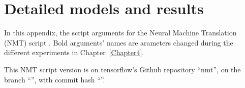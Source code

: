 
\chapter{Detailed models and results} %

\label{AppendixB} %

In this appendix, the script arguments for the Neural Machine Translation (NMT) script \citep{tensorflow.nmt}. Bold arguments' names are arameters changed during the different experiments in Chapter~\ref{Chapter4}.

This NMT script version is on tensorflow's Github repository ``nmt'', on the branch ``'', with commit hash ``''.


